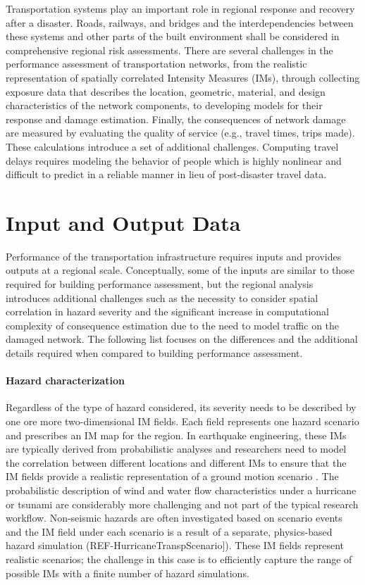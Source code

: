 Transportation systems play an important role in regional response and recovery after a disaster. Roads, railways, and bridges and the interdependencies between these systems and other parts of the built environment shall be considered in comprehensive regional risk assessments. There are several challenges in the performance assessment of transportation networks, from the realistic representation of spatially correlated Intensity Measures (IMs), through collecting exposure data that describes the location, geometric, material, and design characteristics of the network components, to developing models for their response and damage estimation. Finally, the consequences of network damage are measured by evaluating the quality of service (e.g., travel times, trips made). These calculations introduce a set of additional challenges. Computing travel delays requires modeling the behavior of people which is highly nonlinear and difficult to predict in a reliable manner in lieu of post-disaster travel data.
 
\section{Input and Output Data}
\label{sec:perf_transport_io}

Performance of the transportation infrastructure requires inputs and provides outputs at a regional scale. Conceptually, some of the inputs are similar to those required for building performance assessment, but the regional analysis introduces additional challenges such as the necessity to consider spatial correlation in hazard severity and the significant increase in computational complexity of consequence estimation due to the need to model traffic on the damaged network. The following list focuses on the differences and the additional details required when compared to building performance assessment.

\paragraph{Hazard characterization} Regardless of the type of hazard considered, its severity needs to be described by one ore more two-dimensional IM fields. Each field represents one hazard scenario and prescribes an IM map for the region. In earthquake engineering, these IMs are typically derived from probabilistic analyses and researchers need to model the correlation between different locations and different IMs to ensure that the IM fields provide a realistic representation of a ground motion scenario \citep[e.g.,][]{lee2006uncertainty, han2012probabilistic, loth2013spatial}. The probabilistic description of wind and water flow characteristics under a hurricane or tsunami are considerably more challenging and not part of the typical research workflow. Non-seismic hazards are often investigated based on scenario events and the IM field under each scenario is a result of a separate, physics-based hazard simulation (REF-HurricaneTranspScenario]). These IM fields represent realistic scenarios; the challenge in this case is to efficiently capture the range of possible IMs with a finite number of hazard simulations. 

